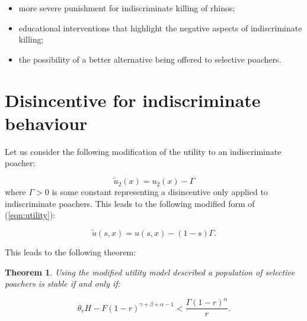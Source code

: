 \documentclass[10pt]{article}
\newtheorem{theorem}{Theorem}
\begin{document}
\begin{itemize}
    \item more severe punishment for indiscriminate killing of rhinos;
    \item educational interventions that highlight the negative aspects of
        indiscriminate killing;
    \item the possibility of a better alternative being offered to selective
        poachers.
\end{itemize}

\section{Disincentive for indiscriminate behaviour}

Let us consider the following modification of the utility to an indiscriminate
poacher:

\begin{equation}
    \label{eqn:modified_utility_for_ind}
    \tilde u_2(x) = u_2(x) - \Gamma
\end{equation}
where \(\Gamma>0\) is some constant representing a disincentive only applied to
indiscriminate poachers. This leads to the following modified form of (\ref{eqn:utility}):

\begin{equation}
    \label{eqn:modified_utility}
    \tilde u(s, x) = u(s, x) - (1 - s) \Gamma.
\end{equation}

\noindent This leads to the following theorem:

\begin{theorem}\label{theorem:selective_new_utility}
Using the modified utility model described
a population of selective poachers is stable if and only if:

\begin{equation}\label{eq:selective_condition_new_utility}
\theta_r H -  F(1 -r) ^{\gamma + \beta + \alpha -1} < \frac{\Gamma (1- r) ^ {\alpha}}{r}.
\end{equation}

\end{theorem}
\end{document}
